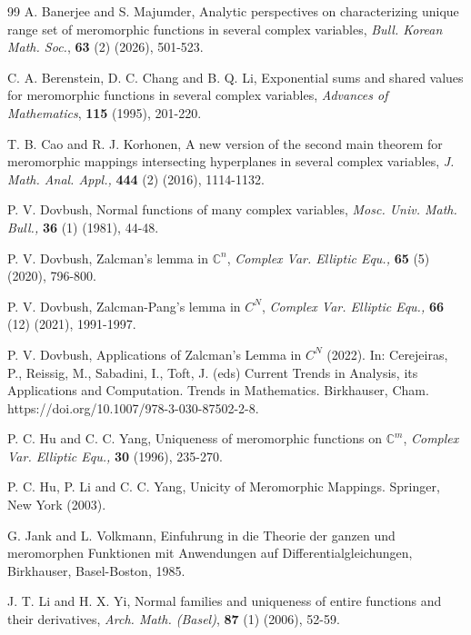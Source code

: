 \documentclass[11pt, reqno]{amsart}
\newtheorem*{cor A}{Corollary A}
\newtheorem*{cor B}{Corollary B}
\numberwithin{equation}{section}
\begin{document}
\begin{thebibliography}{99}
 {\sc A. Banerjee} and {\sc S. Majumder}, Analytic perspectives on characterizing unique range set of meromorphic functions in several complex variables, \textit{Bull. Korean Math. Soc.}, \textbf{63} (2) (2026), 501-523.

 {\sc C. A. Berenstein}, {\sc D. C. Chang} and {\sc B. Q. Li}, Exponential sums and shared values for meromorphic functions in several complex variables, \textit{Advances of Mathematics}, \textbf{115} (1995), 201-220.

 {\sc T. B. Cao} and {\sc R. J. Korhonen}, A new version of the second main theorem for meromorphic mappings intersecting hyperplanes in several complex variables, \textit{J. Math. Anal. Appl.,} \textbf{444} (2) (2016), 1114-1132.

 {\sc P. V. Dovbush}, Normal functions of many complex variables, \textit{Mosc. Univ. Math. Bull.,} \textbf{36} (1) (1981), 44-48.

 {\sc P. V. Dovbush}, Zalcman's lemma in $\mathbb{C}^n$, \textit{Complex Var. Elliptic Equ.,} \textbf{65} (5) (2020), 796-800.

 {\sc P. V. Dovbush}, Zalcman-Pang's lemma in $C^N$, \textit{Complex Var. Elliptic Equ.,} \textbf{66} (12) (2021), 1991-1997.

 {\sc P. V. Dovbush}, Applications of Zalcman's Lemma in $C^N$ (2022). In: Cerejeiras, P., Reissig, M., Sabadini, I., Toft, J. (eds) Current Trends in Analysis, its Applications and Computation. Trends in Mathematics. Birkhauser, Cham. https://doi.org/10.1007/978-3-030-87502-2-8.

 {\sc P. C. Hu} and {\sc C. C. Yang}, Uniqueness of meromorphic functions on $\mathbb{C}^m$, \textit{Complex Var. Elliptic Equ.,} \textbf{30} (1996), 235-270.

 {\sc P. C. Hu}, {\sc P. Li} and {\sc C. C. Yang}, Unicity of Meromorphic Mappings. Springer, New York (2003).

 {\sc G. Jank} and {\sc L. Volkmann}, Einfuhrung in die Theorie der ganzen und meromorphen Funktionen mit Anwendungen auf Differentialgleichungen, Birkhauser, Basel-Boston, 1985.

 {\sc J. T. Li} and {\sc H. X. Yi}, Normal families and uniqueness of entire functions and their derivatives, \textit{Arch. Math. (Basel)}, \textbf{87} (1) (2006), 52-59.


\end{thebibliography}
\end{document}
